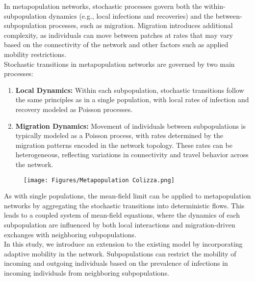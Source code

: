 In metapopulation networks, stochastic processes govern both the within-subpopulation dynamics (e.g., local infections and recoveries) and the between-subpopulation processes, such as migration. Migration introduces additional complexity, as individuals can move between patches at rates that may vary based on the connectivity of the network and other factors such as applied mobility restrictions.\\

Stochastic transitions in metapopulation networks are governed by two main processes:

\begin{enumerate}
    \item \textbf{Local Dynamics:} Within each subpopulation, stochastic transitions follow the same principles as in a single population, with local rates of infection and recovery modeled as Poisson processes.
    \item \textbf{Migration Dynamics:} Movement of individuals between subpopulations is typically modeled as a Poisson process, with rates determined by the migration patterns encoded in the network topology. These rates can be heterogeneous, reflecting variations in connectivity and travel behavior across the network.
\end{enumerate}

\begin{figure}
    \centering
    \texttt{[image: Figures/Metapopulation Colizza.png]}
\end{figure}
As with single populations, the mean-field limit can be applied to metapopulation networks by aggregating the stochastic transitions into deterministic flows. This leads to a coupled system of mean-field equations, where the dynamics of each subpopulation are influenced by both local interactions and migration-driven exchanges with neighboring subpopulations.\\

In this study, we introduce an extension to the existing model by incorporating adaptive mobility in the network. Subpopulations can restrict the mobility of incoming and outgoing individuals based on the prevalence of infections in incoming individuals from neighboring subpopulations.\\

% 